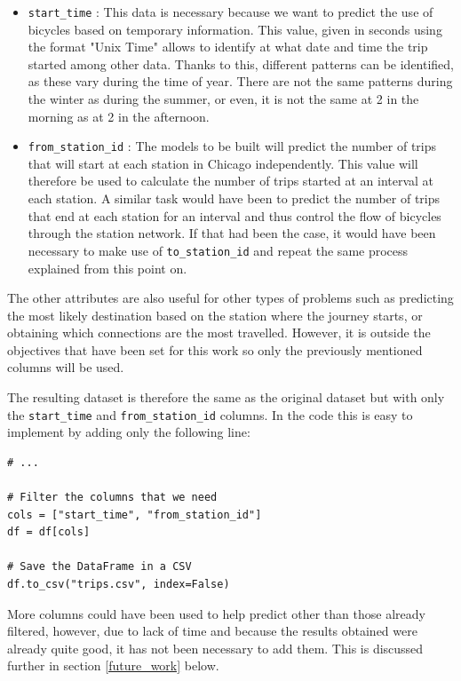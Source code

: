 \begin{itemize}
    \item \small{\verb|start_time|} \normalsize : This data is necessary because we want to predict the use of bicycles based on temporary information. This value, given in seconds using the format "Unix Time" \cite{unix_time} allows to identify at what date and time the trip started among other data. Thanks to this, different patterns can be identified, as these vary during the time of year. There are not the same patterns during the winter as during the summer, or even, it is not the same at 2 in the morning as at 2 in the afternoon.
    
    \item \small{\verb|from_station_id|} \normalsize : The models to be built will predict the number of trips that will start at each station in Chicago independently. This value will therefore be used to calculate the number of trips started at an interval at each station. A similar task would have been to predict the number of trips that end at each station for an interval and thus control the flow of bicycles through the station network. If that had been the case, it would have been necessary to make use of \small{\verb|to_station_id|} \normalsize  and repeat the same process explained from this point on.
\end{itemize}

The other attributes are also useful for other types of problems such as predicting the most likely destination based on the station where the journey starts, or obtaining which connections are the most travelled. However, it is outside the objectives that have been set for this work so only the previously mentioned columns will be used.
\newline
 
 
The resulting dataset is therefore the same as the original dataset but with only the \small{\verb|start_time|} \normalsize  and \small{\verb|from_station_id|} \normalsize  columns. In the code this is easy to implement by adding only the following line:

\begin{verbatim}
# ...
    
# Filter the columns that we need
cols = ["start_time", "from_station_id"]
df = df[cols]

# Save the DataFrame in a CSV
df.to_csv("trips.csv", index=False)
\end{verbatim}

More columns could have been used to help predict other than those already filtered, however, due to lack of time and because the results obtained were already quite good, it has not been necessary to add them. This is discussed further in section \ref{future_work} below.
\newline

